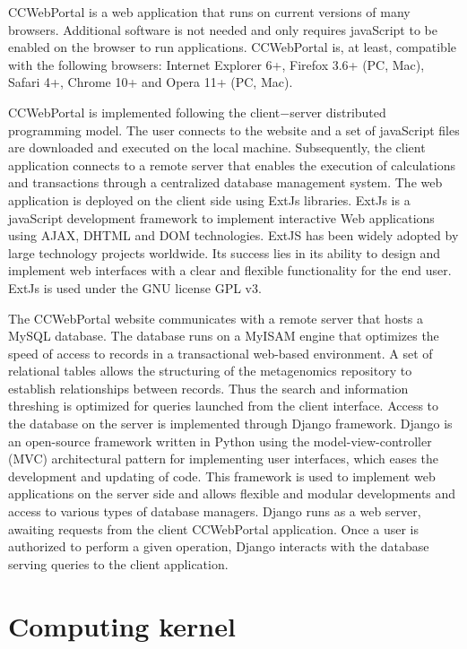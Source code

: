 \documentclass[12pt]{article}
\begin{document}
CCWebPortal is a web application that runs on current versions of many browsers. Additional software is not needed and only requires javaScript to be enabled on the browser to run applications. CCWebPortal is, at least, compatible with the following browsers: Internet Explorer 6+, Firefox 3.6+ (PC, Mac), Safari 4+, Chrome 10+ and Opera 11+ (PC, Mac).

CCWebPortal is implemented following the client$-$server distributed programming model. The user connects to the website and a set of javaScript files are downloaded and executed on the local machine. Subsequently, the client application connects to a remote server that enables the execution of calculations and transactions through a centralized database management system. The web application is deployed on the client side using ExtJs libraries. ExtJs is a javaScript development framework to implement interactive Web applications using AJAX, DHTML and DOM technologies. ExtJS has been widely adopted by large technology projects worldwide. Its success lies in its ability to design and implement web interfaces with a clear and flexible functionality for the end user. ExtJs is used under the GNU license GPL v3.

The CCWebPortal website communicates with a remote server that hosts a MySQL database. The database runs on a MyISAM engine that optimizes the speed of access to records in a transactional web-based environment. A set of relational tables allows the structuring of the metagenomics repository to establish relationships between records. Thus the search and information threshing is optimized for queries launched from the client interface. Access to the database on the server is implemented through Django framework. Django is an open-source framework written in Python using the model-view-controller (MVC) architectural pattern for implementing user interfaces, which eases the development and updating of code. This framework is used to implement web applications on the server side and allows flexible and modular developments and access to various types of database managers. Django runs as a web server, awaiting requests from the client CCWebPortal application. Once a user is authorized to perform a given operation, Django interacts with the database serving queries to the client application.

\section{Computing kernel}
\end{document}
